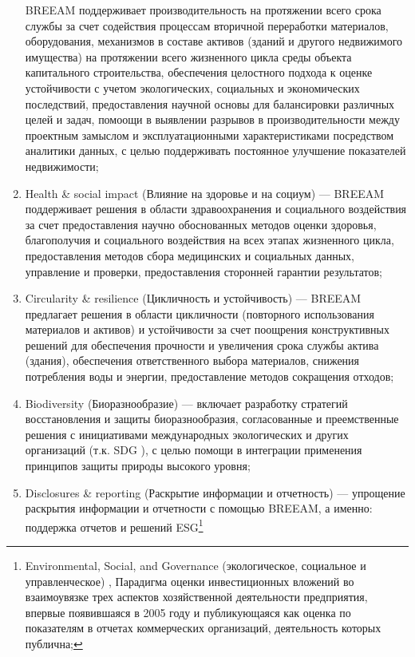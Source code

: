 \begin{enumerate}[1)]
        BREEAM поддерживает производительность на протяжении всего срока службы за счет содействия процессам вторичной переработки материалов,
        оборудования, механизмов в составе активов (зданий и другого недвижимого имущества) на протяжении всего жизненного цикла среды объекта капитального строительства,
        обеспечения целостного подхода к оценке устойчивости с учетом экологических, социальных и экономических последствий,
        предоставления научной основы для балансировки различных целей и задач,
        помоощи в выявлении разрывов в производительности между проектным замыслом и эксплуатационными характеристиками посредством аналитики данных,
        с целью поддерживать постоянное улучшение показателей недвижимости;
    \item Health \& social impact (Влияние на здоровье и на социум) --- BREEAM поддерживает решения в области здравоохранения и социального воздействия за счет
        предоставления научно обоснованных методов оценки здоровья, благополучия и социального воздействия на всех этапах жизненного цикла,
        предоставления методов сбора медицинских и социальных данных, управление и проверки, предоставления сторонней гарантии результатов;
    \item Circularity \& resilience (Цикличность и устойчивость) --- BREEAM предлагает решения в области цикличности (повторного использования материалов и активов) и устойчивости за счет
        поощрения конструктивных решений для обеспечения прочности и увеличения срока службы актива (здания), обеспечения ответственного выбора материалов,
        снижения потребления воды и энергии, предоставление методов сокращения отходов;
    \item Biodiversity (Биоразнообразие) --- включает разработку стратегий восстановления и защиты биоразнообразия,
        согласованные и преемственные решения с инициативами международных экологических и других организаций (т.к. SDG \cite{UN_17Goals}),
        с целью помощи в интеграции применения принципов защиты природы высокого уровня;
    \item Disclosures \& reporting (Раскрытие информации и отчетность) --- упрощение раскрытия информации и отчетности с помощью BREEAM, а именно:
        поддержка отчетов и решений ESG\footnote{Environmental, Social, and Governance (экологическое, социальное и управленческое) \cite{business_US_ESG},
            Парадигма оценки инвестиционных вложений во взаимоувязке трех аспектов хозяйственной деятельности предприятия, впервые появившаяся в 2005 году
            и публикующаяся как оценка по показателям в отчетах коммерческих организаций, деятельность которых публична;
}
\end{enumerate}

